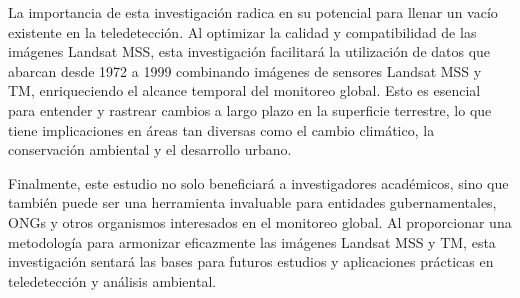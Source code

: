         La importancia de esta investigación radica en su potencial para llenar un vacío existente en la teledetección. Al optimizar la calidad y compatibilidad de las imágenes Landsat MSS, esta investigación facilitará la utilización de datos que abarcan desde 1972 a 1999 combinando imágenes de sensores Landsat MSS y TM, enriqueciendo el alcance temporal del monitoreo global. Esto es esencial para entender y rastrear cambios a largo plazo en la superficie terrestre, lo que tiene implicaciones en áreas tan diversas como el cambio climático, la conservación ambiental y el desarrollo urbano.
        
       Finalmente, este estudio no solo beneficiará a investigadores académicos, sino que también puede ser una herramienta invaluable para entidades gubernamentales, ONGs y otros organismos interesados en el monitoreo global. Al proporcionar una metodología para armonizar eficazmente las imágenes Landsat MSS y TM, esta investigación sentará las bases para futuros estudios y aplicaciones prácticas en teledetección y análisis ambiental.

    
    
    